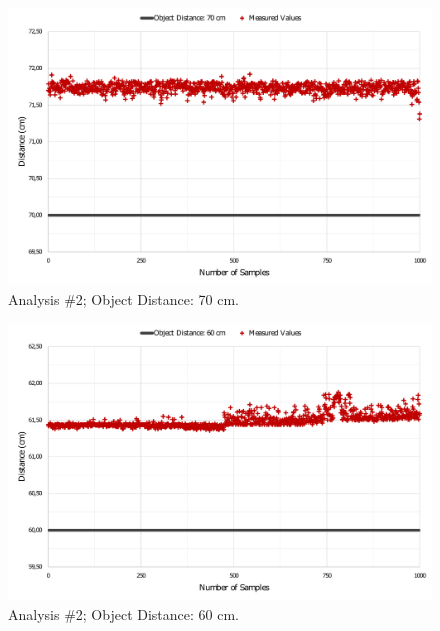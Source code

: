 \begin{figure}[h!]
    \centering
    \includegraphics[scale=0.52]{images/Results/testing_methodology/conf70.pdf}
    \caption{Analysis \#2; Object Distance: 70 cm.}
    \label{fig:conf70}
\end{figure}

\begin{figure}[h!]
    \centering
    \includegraphics[scale=0.52]{images/Results/testing_methodology/conf60.pdf}
    \caption{Analysis \#2; Object Distance: 60 cm.}
    \label{fig:conf60}
\end{figure}

